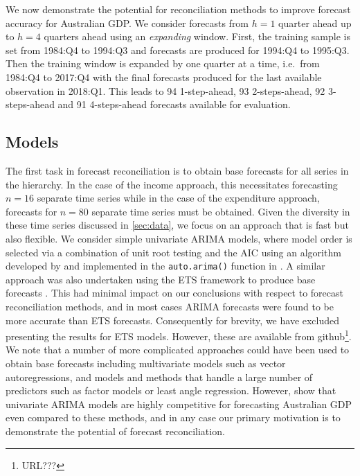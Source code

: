 \documentclass[graybox]{svmult}
\begin{document}
We now demonstrate the potential for reconciliation methods to improve forecast accuracy for Australian GDP\@. We consider forecasts from $h=1$ quarter ahead up to $h=4$ quarters ahead using an \emph{expanding} window. First, the training sample is set from 1984:Q4 to 1994:Q3 and forecasts are produced for 1994:Q4 to 1995:Q3. Then the training window is expanded by one quarter at a time, i.e.\ from 1984:Q4 to 2017:Q4 with the final forecasts produced for the last available observation in 2018:Q1. This leads to 94 1-step-ahead, 93 2-steps-ahead, 92 3-steps-ahead and 91 4-steps-ahead forecasts available for evaluation.

\subsection{Models}

The first task in forecast reconciliation is to obtain base forecasts for all series in the hierarchy. In the case of the income approach, this necessitates forecasting $n=16$ separate time series while in the case of the expenditure approach, forecasts for $n=80$ separate time series must be obtained. Given the diversity in these time series discussed in \autoref{sec:data}, we focus on an approach that is fast but also flexible. We consider simple univariate ARIMA models, where model order is selected via a combination of unit root testing and the AIC using an algorithm developed by \citet{HK08} and implemented in the \verb|auto.arima()| function in \citet{Rforecast}. A similar approach was also undertaken using the ETS framework to produce base forecasts \citep{expsmooth08}. This had minimal impact on our conclusions with respect to forecast reconciliation methods, and in most cases ARIMA forecasts were found to be more accurate than ETS forecasts. Consequently for brevity, we have excluded presenting the results for ETS models. However, these are available from github\footnote{URL???}. We note that a number of more complicated approaches could have been used to obtain base forecasts including multivariate models such as vector autoregressions, and models and methods that handle a large number of predictors such as factor models or least angle regression. However, \citet{PanEtAl2019} show that univariate ARIMA models are highly competitive for forecasting Australian GDP even compared to these methods, and in any case our primary motivation is to demonstrate the potential of forecast reconciliation.
\end{document}
